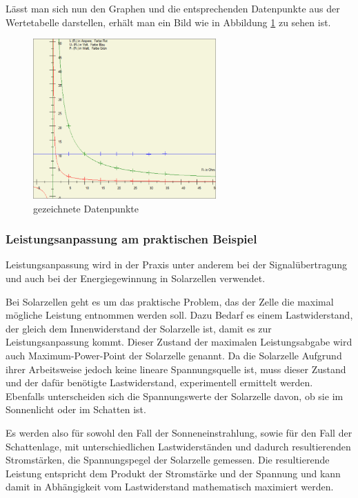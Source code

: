 \documentclass[a4paper]{article}
\begin{document}
    Lässt man sich nun den Graphen und die entsprechenden Datenpunkte aus der Wertetabelle darstellen, erhält man ein Bild wie in Abbildung \ref{fig:graphbefuellt} zu sehen ist.
    \begin{figure}[!h]
        \begin{center}
            \includegraphics[width=7cm]{img/graphbefuellt}
            \caption{gezeichnete Datenpunkte}
            \label{fig:graphbefuellt}
        \end{center}
    \end{figure}

    \subsubsection{Leistungsanpassung am praktischen Beispiel}
    
    Leistungsanpassung wird in der Praxis unter anderem bei der Signalübertragung und auch bei der Energiegewinnung in Solarzellen verwendet.
    
    Bei Solarzellen geht es um das praktische Problem, das der Zelle die maximal mögliche Leistung entnommen werden soll.
    Dazu Bedarf es einem Lastwiderstand, der gleich dem Innenwiderstand der Solarzelle ist, damit es zur Leistungsanpassung kommt.
    Dieser Zustand der maximalen Leistungsabgabe wird auch \glqq Maximum-Power-Point\grqq{} der Solarzelle genannt.
    Da die Solarzelle Aufgrund ihrer Arbeitsweise jedoch keine lineare Spannungsquelle ist, muss dieser Zustand und der dafür benötigte Lastwiderstand, experimentell ermittelt werden.
    Ebenfalls unterscheiden sich die Spannungswerte der Solarzelle davon, ob sie im Sonnenlicht oder im Schatten ist.
    
    Es werden also für sowohl den Fall der Sonneneinstrahlung, sowie für den Fall der Schattenlage, mit unterschiedlichen Lastwiderständen und dadurch resultierenden Stromstärken, die Spannungspegel der Solarzelle gemessen.
    Die resultierende Leistung entspricht dem Produkt der Stromstärke und der Spannung und kann damit in Abhängigkeit vom Lastwiderstand mathematisch maximiert werden.
    
\end{document}
